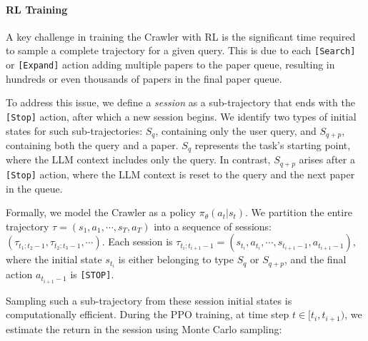 \paragraph{RL Training}

A key challenge in training the Crawler with RL is the significant time required to sample a complete trajectory for a given query. This is due to each \texttt{[Search]} or \texttt{[Expand]} action adding multiple papers to the paper queue, resulting in hundreds or even thousands of papers in the final paper queue. 

To address this issue, we define a \emph{session} as a sub-trajectory that ends with the \texttt{[Stop]} action, after which a new session begins. We identify two types of initial states for such sub-trajectories: $S_q$, containing only the user query, and $S_{q+p}$, containing both the query and a paper. $S_q$ represents the task's starting point, where the LLM context includes only the query. In contrast, $S_{q+p}$ arises after a \texttt{[Stop]} action, where the LLM context is reset to the query and the next paper in the queue.

Formally, we model the Crawler as a policy $\pi_\theta(a_t|s_t)$. We partition the entire trajectory $\tau=(s_1, a_1, \cdots, s_T, a_T)$ into a sequence of sessions: $(\tau_{t_1:t_2-1},\tau_{t_2:t_3-1},\cdots)$. Each session is $\tau_{t_i:t_{i+1}-1}=(s_{t_i}, a_{t_i}, \cdots, s_{t_{i+1}-1}, a_{t_{i+1}-1})$, where the initial state $s_{t_i}$ is either belonging to type $S_q$ or $S_{q+p}$, and the final action $a_{t_{i+1}-1}$ is \texttt{[STOP]}.

Sampling such a sub-trajectory from these session initial states is computationally efficient. During the PPO training, at time step $t\in[t_i, t_{i+1})$, we estimate the return in the session using Monte Carlo sampling:
\begin{comment}
\begin{small}
\begin{eqnarray}\label{q_function}
\hat{R}_t &=& \sum_{k=0}^{t_{i+1}-1-t}\gamma_0^k\bigg[r(s_{t+k}, a_{t+k}) \\
&& +\gamma_1\sum_{j=1}^{n_{t+k}}\hat{V}_\phi(S_{q+p_j})\bigg] - \beta\cdot\log\frac{\pi_\theta(a_t|s_t)}{\pi_{\rm sft}(a_t|s_t)}\nonumber
\end{eqnarray}
\end{small}
\end{comment}

